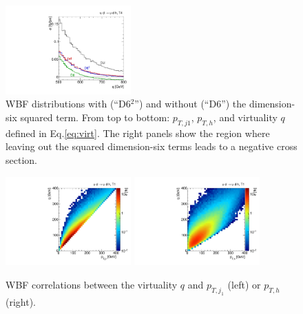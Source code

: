 \begin{figure}
  \hspace*{0.05\textwidth}
  \includegraphics[width=0.43\textwidth]{fig/validity/WBF_T4_q.pdf}
  \caption{WBF distributions with (``D6$^{2}$'') and without (``D6'') the
    dimension-six squared term. From top to bottom: $p_{T,j1}$, $p_{T,h}$, and
    virtuality $q$ defined in Eq.\;\eqref{eq:virt}. The right panels show the region where
    leaving out the squared dimension-six terms leads to a negative cross
    section.}
  \label{fig:validity_squared_WBF}
\end{figure}


\begin{figure}[t]
  \includegraphics[width=0.43\textwidth]{fig/validity/WBF_correl_q_j1pt.pdf}
  \hspace*{0.05\textwidth}
  \includegraphics[width=0.43\textwidth]{fig/validity/WBF_correl_q_Hpt.pdf} 
  \caption{WBF correlations between the virtuality $q$ and
    $p_{T,j_1}$ (left) or $p_{T,h}$ (right).}
  \label{fig:validity_virt_corr}
\end{figure}


